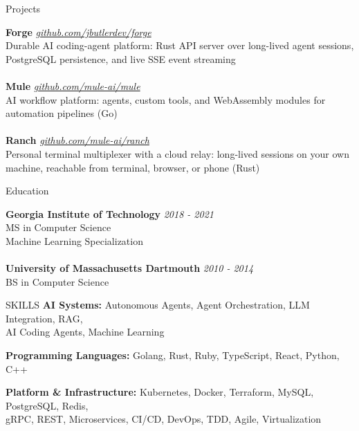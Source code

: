\documentclass{resume} %
\begin{document}
\begin{rSection}{Projects}

{\bf Forge} \hfill {\em \href{https://github.com/jbutlerdev/forge}{github.com/jbutlerdev/forge}}
\\ Durable AI coding-agent platform: Rust API server over long-lived agent sessions, PostgreSQL persistence, and live SSE event streaming
\\
\\{\bf Mule} \hfill {\em \href{https://github.com/mule-ai/mule}{github.com/mule-ai/mule}}
\\ AI workflow platform: agents, custom tools, and WebAssembly modules for automation pipelines (Go)
\\
\\{\bf Ranch} \hfill {\em \href{https://github.com/mule-ai/ranch}{github.com/mule-ai/ranch}}
\\ Personal terminal multiplexer with a cloud relay: long-lived sessions on your own machine, reachable from terminal, browser, or phone (Rust)

\end{rSection}

\begin{rSection}{Education}

{\bf Georgia Institute of Technology} \hfill {\em 2018 - 2021}
\\ MS in Computer Science \hfill
\\ Machine Learning Specialization
\\
\\{\bf University of Massachusetts Dartmouth} \hfill {\em 2010 - 2014}
\\ BS in Computer Science \hfill

\end{rSection}

\begin{rSection}{SKILLS}
\textbf{AI Systems:}
Autonomous Agents, Agent Orchestration, LLM Integration, RAG, \\
AI Coding Agents, Machine Learning

\textbf{Programming Languages:}
Golang, Rust, Ruby, TypeScript, React, Python, C++

\textbf{Platform \& Infrastructure:}
Kubernetes, Docker, Terraform, MySQL, PostgreSQL, Redis, \\
gRPC, REST, Microservices, CI/CD, DevOps, TDD, Agile, Virtualization

\end{rSection}
\end{document}
